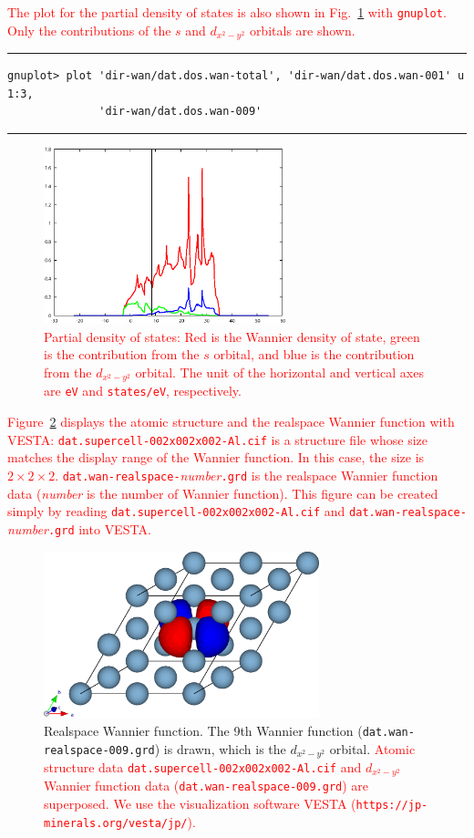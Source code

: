 \documentclass{article}
\newcommand{\tr}[1]{\textcolor{red}{#1}}
\begin{document}
\tr{The plot for the partial density of states is also shown in Fig.~\ref{pdos} with {\tt gnuplot}. Only the contributions of the $s$ and $d_{x^2-y^2}$ orbitals are shown.}
\vspace{3mm}\hrule
\begin{verbatim}
gnuplot> plot 'dir-wan/dat.dos.wan-total', 'dir-wan/dat.dos.wan-001' u 1:3, 
              'dir-wan/dat.dos.wan-009' 
\end{verbatim}
\hrule\vspace{3mm}
\begin{figure}[H] 
\centering
\includegraphics[width=7cm]{dat.pdos-Al.eps}
\caption{\tr{Partial density of states: Red is the Wannier density of state, green is the contribution from the $s$ orbital, and blue is the contribution from the $d_{x^2-y^2}$ orbital. The unit of the horizontal and vertical axes are {\tt eV} and {\tt states/eV}, respectively.}}  
\label{pdos}
\end{figure}

\tr{Figure~\ref{vesta} displays the atomic structure and the realspace Wannier function with {\sc VESTA}: {\tt dat.supercell-002x002x002-Al.cif} is a structure file whose size matches the display range of the Wannier function. In this case, the size is $2\times2\times2$. {\tt dat.wan-realspace-}{\it number}{\tt .grd} is the realspace Wannier function data ({\it number} is the number of Wannier function). This figure can be created simply by reading {\tt dat.supercell-002x002x002-Al.cif} and {\tt dat.wan-realspace-}{\it number}{\tt .grd} into {\sc VESTA}.}  
\begin{figure}[H] 
\centering
\includegraphics[width=8cm]{dat.wan-realspace-Al.eps}
\caption{Realspace Wannier function. The 9th Wannier function ({\tt dat.wan-realspace-009.grd}) is drawn, which is the $d_{x^2-y^2}$ orbital. \tr{Atomic structure data {\tt dat.supercell-002x002x002-Al.cif} and $d_{x^2-y^2}$ Wannier function data ({\tt dat.wan-realspace-009.grd}) are superposed. We use the visualization software {\sc VESTA} ({\tt https://jp-minerals.org/vesta/jp/}).}} 
\label{vesta}
\end{figure}
\end{document}
